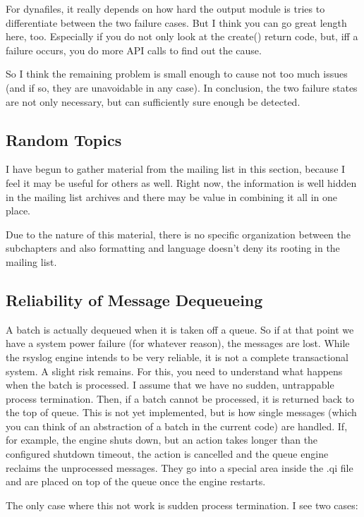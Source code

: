 \documentclass[a4paper,10pt]{article}
\begin{document}
For dynafiles, it really depends on how hard the output module is tries to differentiate
between the two failure cases. But I think you can go great length here, too.
Especially if you do not only look at the create() return code, but, iff a
failure occurs, you do more API calls to find out the cause.

So I think the remaining problem is small enough to cause not too much issues
(and if so, they are unavoidable in any case). In conclusion, the two failure states are not only necessary, but can sufficiently sure enough be detected.

\subsection{Random Topics}
I have begun to gather material from the mailing list in this section, because I feel it may be useful for others as well. Right now, the information is well hidden in the mailing list archives and there may be value in combining it all in one place.

Due to the nature of this material, there is no specific organization between the subchapters and also formatting and language doesn't deny its rooting in the mailing list.

\subsection{Reliability of Message Dequeueing}
A batch is actually dequeued when it is taken off a queue. So if at that point we
have a system power failure (for whatever reason), the messages are lost.
While the rsyslog engine intends to be very reliable, it is not a complete
transactional system. A slight risk remains. For this, you need to understand
what happens when the batch is processed. I assume that we have no sudden,
untrappable process termination. Then, if a batch cannot be processed, it is
returned back to the top of queue. This is not yet implemented, but is how
single messages (which you can think of an abstraction of a batch in the
current code) are handled. If, for example, the engine shuts down, but an
action takes longer than the configured shutdown timeout, the action is
cancelled and the queue engine reclaims the unprocessed messages. They go
into a special area inside the .qi file and are placed on top of the queue
once the engine restarts.

The only case where this not work is sudden process termination. I see two
cases:
\end{document}
